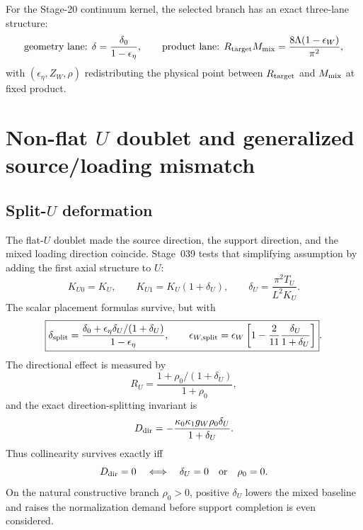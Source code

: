 \begin{proposition}
\label{prop:part03-continuum-factorization}
For the Stage-20 continuum kernel, the selected branch has an exact three-lane structure:
\begin{equation}
\label{eq:part03-three-lane}
\text{geometry lane: }\delta=\frac{\delta_0}{1-\epsilon_\eta},
\qquad
\text{product lane: }R_{\rm target}M_{\rm mix}=\frac{8\Lambda(1-\epsilon_W)}{\pi^2},
\end{equation}
with \((\epsilon_\eta,Z_W,\rho)\) redistributing the physical point between \(R_{\rm target}\) and \(M_{\rm mix}\) at fixed product.
\end{proposition}

\section{Non-flat \texorpdfstring{$U$}{U} doublet and generalized source/loading mismatch}
\label{sec:part03_support_family1:non-flat-u-doublet-and-generalized-source-loading}

\subsection{Split-\texorpdfstring{$U$}{U} deformation}
\label{subsec:part03-split-u}

The flat-\(U\) doublet made the source direction, the support direction, and the mixed loading direction coincide.  Stage~039 tests that simplifying assumption by adding the first axial structure to \(U\):
\begin{equation}
\label{eq:part03-deltaU-def}
K_{U0}=K_U,
\qquad
K_{U1}=K_U\left(1+\delta_U\right),
\qquad
\delta_U=\frac{\pi^2T_U}{L^2K_U}.
\end{equation}
The scalar placement formulas survive, but with
\begin{equation}
\label{eq:part03-split-delta-eps}
\boxed{
\delta_{\rm split}
=\frac{\delta_0+\epsilon_\eta\delta_U/(1+\delta_U)}{1-\epsilon_\eta},
\qquad
\epsilon_{W,\rm split}
=\epsilon_W\left[1-\frac{2}{11}\frac{\delta_U}{1+\delta_U}\right]}.
\end{equation}
The directional effect is measured by
\begin{equation}
\label{eq:part03-RU-def}
R_U=\frac{1+\rho_0/(1+\delta_U)}{1+\rho_0},
\end{equation}
and the exact direction-splitting invariant is
\begin{equation}
\label{eq:part03-Ddir}
D_{\rm dir}=-\frac{\kappa_0\kappa_1g_W\rho_0\delta_U}{1+\delta_U}.
\end{equation}
Thus collinearity survives exactly iff
\begin{equation}
\label{eq:part03-collinearity-iff}
D_{\rm dir}=0
\quad\Longleftrightarrow\quad
\delta_U=0\quad\text{or}\quad \rho_0=0.
\end{equation}
On the natural constructive branch \(\rho_0>0\), positive \(\delta_U\) lowers the mixed baseline and raises the normalization demand before support completion is even considered.

